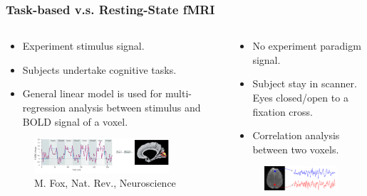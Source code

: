 \documentclass[serif]{beamer}
\begin{document}
\begin{frame}
  \frametitle{Task-based v.s. Resting-State fMRI}
  \begin{columns}[t]
    \begin{column}{5cm}
      \begin{block}{}
        \begin{itemize}
        \item Experiment stimulus signal.
        \item Subjects undertake cognitive tasks.
        \item General linear model is used for multi-regression analysis between
          stimulus and BOLD signal of a voxel.
        \end{itemize}
      \end{block}
      \begin{figure}
        \includegraphics[width=5cm]{sfig/taskfmri}
        \caption{\tiny M. Fox, Nat. Rev., Neuroscience}
        \end{figure}

    \end{column}

    \begin{column}{5cm}
      \begin{block}{}
        \begin{itemize}
        \item No experiment paradigm signal.
        \item Subject stay in scanner. Eyes closed/open to a fixation cross.
        \item Correlation analysis between two voxels.
        \end{itemize}
      \end{block}
      \begin{figure}
        \includegraphics[width=5cm]{sfig/corr}
        \end{figure}
    \end{column}

  \end{columns}
\end{frame}
\end{document}
